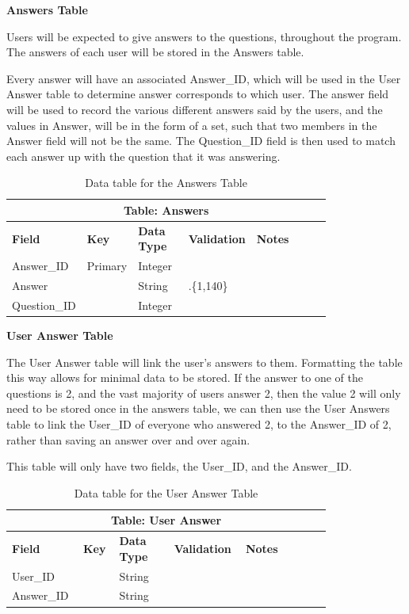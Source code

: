 \documentclass{article}
\begin{document}
\clearpage

\textbf{Answers Table}

Users will be expected to give answers to the questions, throughout the program. The answers of each user will be stored in the Answers table.

Every answer will have an associated Answer\_ID, which will be used in the User Answer table to determine answer corresponds to which user. The answer field will be used to record the various different answers said by the users, and the values in Answer, will be in the form of a set, such that two members in the Answer field will not be the same. The Question\_ID field is then used to match each answer up with the question that it was answering.

\begin{table}[ht]
    \centering
    \begin{tabular}{ | p{0.15\linewidth} | p{0.1\linewidth} | p{0.16\linewidth} | p{0.14\linewidth} | p{0.25\linewidth} | }
    \hline
    \multicolumn{5}{|c|}{\textbf{Table: Answers}}\\
    \hline
    \hline
    \textbf{Field} & \textbf{Key} & \textbf{Data Type} & \textbf{Validation} & \textbf{Notes} \\
    \hline
    Answer\_ID & Primary & Integer & & \\
    \hline
    Answer & & String & .\{1,140\} & \\
    \hline
    Question\_ID & & Integer & & \\
    \hline
    \end{tabular}
    \caption{Data table for the Answers Table}
\end{table}

\textbf{User Answer Table}

The User Answer table will link the user's answers to them. Formatting the table this way allows for minimal data to be stored. If the answer to one of the questions is 2, and the vast majority of users answer 2, then the value 2 will only need to be stored once in the answers table, we can then use the User Answers table to link the User\_ID of everyone who answered 2, to the Answer\_ID of 2, rather than saving an answer over and over again.

This table will only have two fields, the User\_ID, and the Answer\_ID.

\begin{table}[ht]
    \centering
    \begin{tabular}{ | p{0.15\linewidth} | p{0.1\linewidth} | p{0.16\linewidth} | p{0.14\linewidth} | p{0.25\linewidth} | }
    \hline
    \multicolumn{5}{|c|}{\textbf{Table: User Answer}}\\
    \hline
    \hline
    \textbf{Field} & \textbf{Key} & \textbf{Data Type} & \textbf{Validation} & \textbf{Notes} \\
    \hline
    User\_ID & & String & & \\
    \hline
    Answer\_ID & & String & & \\
    \hline
    \end{tabular}
    \caption{Data table for the User Answer Table}
\end{table}
\end{document}
